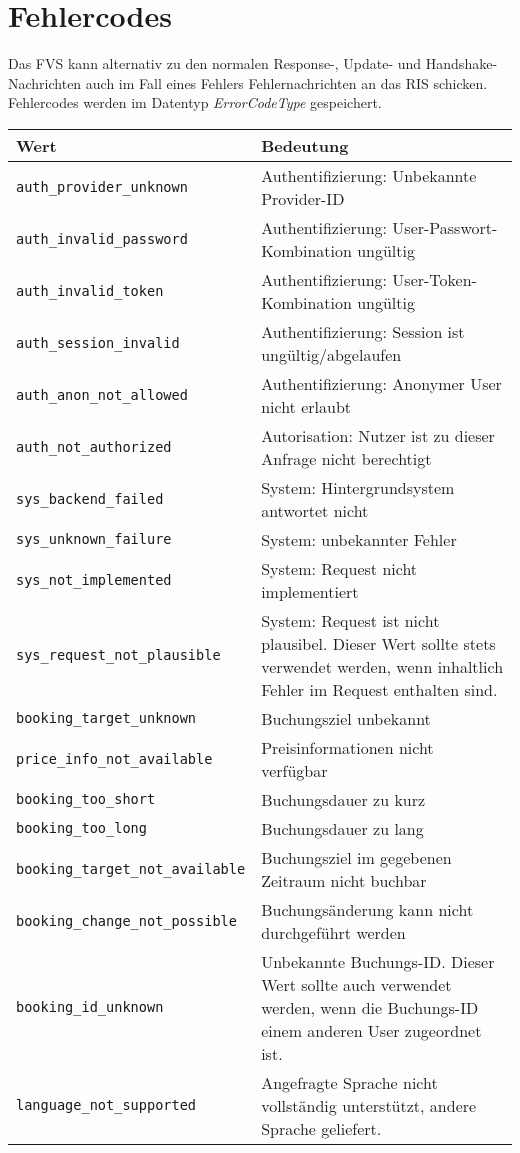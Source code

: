 \section{Fehlercodes}
Das FVS kann alternativ zu den normalen Response-, Update- und Handshake-Nachrichten auch im Fall eines Fehlers Fehlernachrichten an das RIS schicken. Fehlercodes werden im Datentyp \emph{ErrorCodeType} gespeichert.
\begin{flushleft}
\begin{tabularx}{\linewidth}{l>{\raggedright\arraybackslash}X} 
\toprule
Wert & Bedeutung\\
\midrule
\verb|auth_provider_unknown| & Authentifizierung: Unbekannte Provider-ID\\
\verb|auth_invalid_password| & Authentifizierung: User-Passwort-Kombination ungültig\\
\verb|auth_invalid_token| & Authentifizierung: User-Token-Kombination ungültig\\
\verb|auth_session_invalid| & Authentifizierung: Session ist ungültig/abgelaufen\\
\verb|auth_anon_not_allowed| & Authentifizierung: Anonymer User nicht erlaubt\\
\verb|auth_not_authorized| & Autorisation: Nutzer ist zu dieser Anfrage nicht berechtigt\\
\verb|sys_backend_failed| & System: Hintergrundsystem antwortet nicht\\
\verb|sys_unknown_failure| & System: unbekannter Fehler\\
\verb|sys_not_implemented| & System: Request nicht implementiert\\
\verb|sys_request_not_plausible| & System: Request ist nicht plausibel. Dieser Wert sollte stets verwendet werden, wenn inhaltlich Fehler im Request enthalten sind.\\
\verb|booking_target_unknown| & Buchungsziel unbekannt\\
\verb|price_info_not_available| & Preisinformationen nicht verfügbar\\
\verb|booking_too_short| & Buchungsdauer zu kurz\\
\verb|booking_too_long| & Buchungsdauer zu lang\\
\verb|booking_target_not_available| & Buchungsziel im gegebenen Zeitraum nicht buchbar\\
\verb|booking_change_not_possible| & Buchungsänderung kann nicht durchgeführt werden\\
\verb|booking_id_unknown| & Unbekannte Buchungs-ID. Dieser Wert sollte auch verwendet werden, wenn die Buchungs-ID einem anderen User zugeordnet ist.\\
\verb|language_not_supported| & Angefragte Sprache nicht vollständig unterstützt, andere Sprache geliefert.\\
\bottomrule
\end{tabularx}
\end{flushleft}
